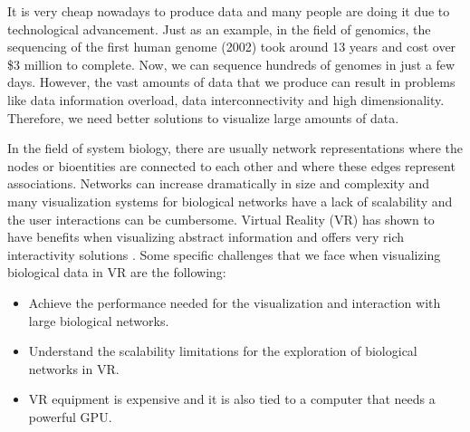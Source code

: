 
It is very cheap nowadays to produce data and many people are doing it due to technological advancement. Just as an example, in the field of genomics, the sequencing of the first human genome (2002) took around 13 years and cost over \$3 million to complete. Now, we can sequence hundreds of genomes in just a few days\cite{big_biological_impacts_bd}. However, the vast amounts of data that we produce can result in problems like data information overload, data interconnectivity and high dimensionality. Therefore, we need better solutions to visualize large amounts of data.



In the field of system biology, there are usually network representations where the nodes or bioentities are connected to each other and where these edges represent associations. Networks can increase dramatically in size and complexity and many visualization systems for biological networks have a lack of scalability and the user interactions can be cumbersome. Virtual Reality (VR) has shown to have benefits when visualizing abstract information and offers very rich interactivity solutions \cite{zhang_paciorkowski_craig_cui_2019}. Some specific challenges that we face when visualizing biological data in VR are the following:
\begin{itemize}
  \item Achieve the performance needed for the visualization and interaction with large biological networks.
  \item Understand the scalability limitations for the exploration of biological networks in VR.
  \item VR equipment is expensive and it is also tied to a computer that needs a powerful GPU.
\end{itemize}

